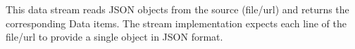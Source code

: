 
This data stream reads JSON objects from the source (file/url) and
returns the corresponding Data items. The stream implementation expects
each line of the file/url to provide a single object in JSON format.

\afterpage{\clearpage}